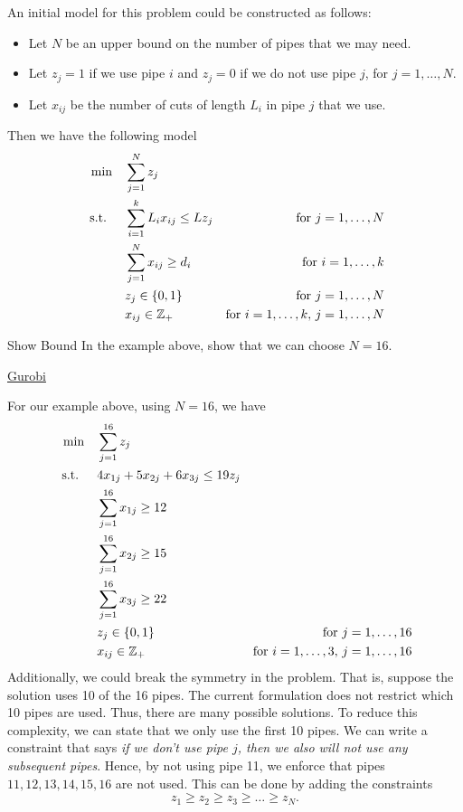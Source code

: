 An initial model for this problem could be constructed as follows:  
\begin{itemize}
\item Let $N$ be an upper bound on the number of pipes that we may need.
\item Let $z_j = 1$ if we use pipe $i$ and $z_j = 0$ if we do not use pipe $j$, for $j=1, \dots, N$.
\item Let $x_{ij}$ be the number of cuts of length $L_i$ in pipe $j$ that we use.
\end{itemize}
Then we have the following model
\begin{align*}
\min \quad & \sum_{j=1}^N z_j\\
\mbox{ s.t. } \quad  & \sum_{i=1}^k  L_i x_{ij} \leq Lz_j & \mbox{for } j=1,\dots, N\\
& \sum_{j=1}^N x_{ij} \geq d_i & \mbox{for } i=1, \dots, k\\
& z_j \in \{0,1\} & \mbox{for } j=1, \dots, N\\
& x_{ij} \in \mathbb{Z}_+ & \mbox{for } i=1, \dots, k,\, j=1, \dots, N
\end{align*}
\begin{exercise}{Show Bound}{}
In the example above, show that we can choose $N=16$.
\end{exercise}
\begin{examplewithcode}{}{\href{https://github.com/open-optimization/open-optimization-or-examples/blob/master/integer-programming/cutting-stock.ipynb}{Gurobi}}{}{}

For our example above, using $N=16$, we have
\begin{align*}
\min \quad & \sum_{j=1}^{16} z_j\\
\mbox{ s.t. } \quad  & 4 x_{1j} + 5 x_{2j} + 6 x_{3j} \leq 19 z_j\\
& \sum_{j=1}^{16} x_{1j} \geq 12\\
& \sum_{j=1}^{16} x_{2j} \geq 15\\
& \sum_{j=1}^{16} x_{3j} \geq 22\\
& z_j \in \{0,1\} & \mbox{for } j=1, \dots, 16\\
& x_{ij} \in \mathbb{Z}_+ & \mbox{for } i=1, \dots, 3,\, j=1, \dots, 16
\end{align*}
Additionally, we could break the symmetry in the problem.  That is, suppose the solution uses 10 of the 16 pipes.  The current formulation does not restrict which 10 pipes are used.  Thus, there are many possible solutions.  To reduce this complexity, we can state that we only use the first 10 pipes.  We can write a constraint that says \emph{if we don't use pipe $j$, then we also will not use any subsequent pipes}.  Hence, by not using pipe 11, we enforce that pipes $11, 12, 13, 14,15,16$ are not used.  This can be done by adding the constraints
\begin{equation}
z_1 \geq z_2 \geq z_3 \geq \dots \geq z_N.
\end{equation}

\end{examplewithcode}

